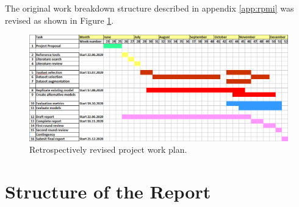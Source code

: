 The original work breakdown structure described in appendix \ref{app:rpmi} was revised as shown in Figure \ref{fig:Revised-work-breakdown-structure}. 

\begin{figure}[ht]
 \centering 
 \includegraphics[width=\textwidth]{Figures/Revised-work-breakdown-structure.png}
 \caption{Retrospectively revised project work plan.}
 \label{fig:Revised-work-breakdown-structure} 
\end{figure}


\section{Structure of the Report}

